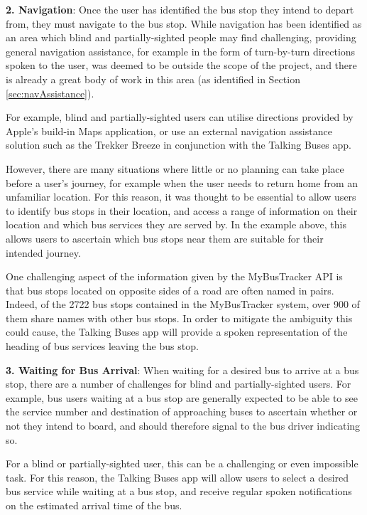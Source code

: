 \documentclass[10pt,twocolumn]{article}
\begin{document}
\textbf{2. Navigation}:
Once the user has identified the bus stop they intend to depart from, they must navigate to the bus stop. While navigation has been identified as an area which blind and partially-sighted people may find challenging, providing general navigation assistance, for example in the form of turn-by-turn directions spoken to the user, was deemed to be outside the scope of the project, and there is already a great body of work in this area (as identified in Section \ref{sec:navAssistance}).

For example, blind and partially-sighted users can utilise directions provided by Apple's build-in Maps application, or use an external navigation assistance solution such as the Trekker Breeze in conjunction with the Talking Buses app.

However, there are many situations where little or no planning can take place before a user's journey, for example when the user needs to return home from an unfamiliar location. For this reason, it was thought to be essential to allow users to identify bus stops in their location, and access a range of information on their location and which bus services they are served by. In the example above, this allows users to ascertain which bus stops near them are suitable for their intended journey.

One challenging aspect of the information given by the MyBusTracker API is that bus stops located on opposite sides of a road are often named in pairs. Indeed, of the 2722 bus stops contained in the MyBusTracker system, over 900 of them share names with other bus stops. In order to mitigate the ambiguity this could cause, the Talking Buses app will provide a spoken representation of the heading of bus services leaving the bus stop.

\textbf{3. Waiting for Bus Arrival}:
When waiting for a desired bus to arrive at a bus stop, there are a number of challenges for blind and partially-sighted users. For example, bus users waiting at a bus stop are generally expected to be able to see the service number and destination of approaching buses to ascertain whether or not they intend to board, and should therefore signal to the bus driver indicating so.

For a blind or partially-sighted user, this can be a challenging or even impossible task. For this reason, the Talking Buses app will allow users to select a desired bus service while waiting at a bus stop, and receive regular spoken notifications on the estimated arrival time of the bus.
\end{document}
